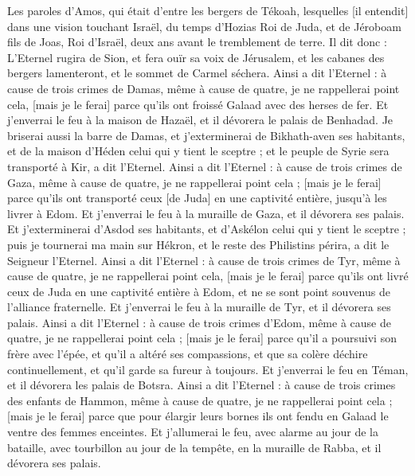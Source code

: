 \BFont
\begin{multicols}{2}
\VerseOne{}Les paroles d'Amos, qui était d'entre les bergers de Tékoah, lesquelles [il entendit] dans une vision touchant Israël, du temps d'Hozias Roi de Juda, et de Jéroboam fils de Joas, Roi d'Israël, deux ans avant le tremblement de terre.
Il dit donc : L'Eternel rugira de Sion, et fera ouïr sa voix de Jérusalem, et les cabanes des bergers lamenteront, et le sommet de Carmel séchera.
Ainsi a dit l'Eternel : à cause de trois crimes de Damas, même à cause de quatre, je ne rappellerai point cela, [mais je le ferai] parce qu'ils ont froissé Galaad avec des herses de fer.
Et j'enverrai le feu à la maison de Hazaël, et il dévorera le palais de Benhadad.
Je briserai aussi la barre de Damas, et j'exterminerai de Bikhath-aven ses habitants, et de la maison d'Héden celui qui y tient le sceptre ; et le peuple de Syrie sera transporté à Kir, a dit l'Eternel.
Ainsi a dit l'Eternel : à cause de trois crimes de Gaza, même à cause de quatre, je ne rappellerai point cela ; [mais je le ferai] parce qu'ils ont transporté ceux [de Juda] en une captivité entière, jusqu'à les livrer à Edom.
Et j'enverrai le feu à la muraille de Gaza, et il dévorera ses palais.
Et j'exterminerai d'Asdod ses habitants, et d'Askélon celui qui y tient le sceptre ; puis je tournerai ma main sur Hékron, et le reste des Philistins périra, a dit le Seigneur l'Eternel.
Ainsi a dit l'Eternel : à cause de trois crimes de Tyr, même à cause de quatre, je ne rappellerai point cela, [mais je le ferai] parce qu'ils ont livré ceux de Juda en une captivité entière à Edom, et ne se sont point souvenus de l'alliance fraternelle.
Et j'enverrai le feu à la muraille de Tyr, et il dévorera ses palais.
Ainsi a dit l'Eternel : à cause de trois crimes d'Edom, même à cause de quatre, je ne rappellerai point cela ; [mais je le ferai] parce qu'il a poursuivi son frère avec l'épée, et qu'il a altéré ses compassions, et que sa colère déchire continuellement, et qu'il garde sa fureur à toujours.
Et j'enverrai le feu en Téman, et il dévorera les palais de Botsra.
Ainsi a dit l'Eternel : à cause de trois crimes des enfants de Hammon, même à cause de quatre, je ne rappellerai point cela ; [mais je le ferai] parce que pour élargir leurs bornes ils ont fendu en Galaad le ventre des femmes enceintes.
Et j'allumerai le feu, avec alarme au jour de la bataille, avec tourbillon au jour de la tempête, en la muraille de Rabba, et il dévorera ses palais.

\end{multicols}
